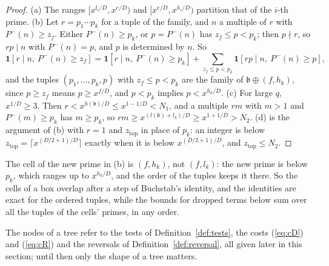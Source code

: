\documentclass[11pt]{article}
\theoremstyle{definition}
\begin{document}
\begin{proof}
(a) The ranges $[x^{l_i/D}, x^{e/D})$ and $[x^{e/D}, x^{h_i/D})$ partition that of the $i$-th prime. (b) Let $r = p_1
\cdots p_k$ for a tuple of the family, and $n$ a multiple of $r$ with $P^-(n) \ge z_f$. Either $P^-(n) \ge p_k$, or $p =
P^-(n)$ has $z_f \le p < p_k$; then $p \nmid r$, so $rp \mid n$ with $P^-(n) = p$, and $p$ is determined by $n$. So
\[
  \mathbf 1[r \mid n,\ P^-(n) \ge z_f] = \mathbf 1[r \mid n,\ P^-(n) \ge p_k]
  + \sum_{z_f \le p < p_k} \mathbf 1[rp \mid n,\ P^-(n) \ge p],
\]
and the tuples $(p_1, \dots, p_k, p)$ with $z_f \le p < p_k$ are the family of $\mathfrak b \oplus (f, h_k)$, since $p
\ge
z_f$ means $p \ge x^{f/D}$, and $p < p_k$ implies $p < x^{h_k/D}$. (c) For large $q$, $x^{1/D} \ge 3$. Then $r <
x^{h(\mathfrak b)/D} \le x^{1 - 1/D} < N_1$, and a multiple $rm$ with $m > 1$ and $P^-(m) \ge p_k$ has $m \ge p_k$, so
$rm \ge x^{(l(\mathfrak b) + l_k)/D} \ge x^{1 + 1/D} > N_2$. (d) is the argument of (b) with $r = 1$ and
$z_{\mathrm{top}}$
in place of $p_k$: an integer is below $z_{\mathrm{top}} = \lceil x^{(D/2 + 1)/D} \rceil$ exactly when it is below
$x^{(D/2 + 1)/D}$, and $z_{\mathrm{top}} \le N_2$.
\end{proof}

The cell of the new prime in (b) is $(f, h_k)$, not $(f, l_k)$: the new prime is below $p_k$, which ranges up to
$x^{h_k/D}$, and the order of the tuples keeps it there. So the cells of a box overlap after a step of Buchstab's
identity, and the identities are exact for the ordered tuples, while the bounds for dropped terms below sum over all the
tuples of the cells' primes, in any order.

The nodes of a tree refer to the tests of Definition~\ref{def:tests}, the costs (\ref{eq:cD}) and (\ref{eq:cR}) and the
reversals of Definition~\ref{def:reversal}, all given later in this section; until then only the shape of a tree
matters.
\end{document}
